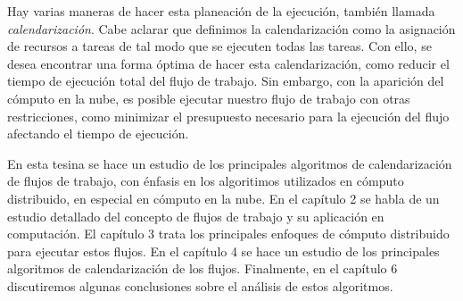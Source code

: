 Hay varias maneras de hacer esta planeación de la ejecución, también llamada \emph{calendarización}. Cabe aclarar que definimos la calendarización como la asignación de recursos a tareas de tal modo que se ejecuten todas las tareas. Con ello, se desea encontrar una forma óptima de hacer esta calendarización, como reducir el tiempo de ejecución total del flujo de trabajo. Sin embargo, con la aparición del cómputo en la nube, es posible ejecutar nuestro flujo de trabajo con otras restricciones, como minimizar el presupuesto necesario para la ejecución del flujo afectando el tiempo de ejecución.



En esta tesina se hace un estudio de los principales algoritmos de calendarización de flujos de trabajo, con énfasis en los algoritimos utilizados en cómputo distribuido, en especial en cómputo en la nube. En el capítulo 2 se habla de un estudio detallado del concepto de flujos de trabajo y su aplicación en computación. El capítulo 3 trata los principales enfoques de cómputo distribuido para ejecutar estos flujos. En el capítulo 4 se hace un estudio de los principales algoritmos de calendarización de los flujos. Finalmente, en el capítulo 6 discutiremos algunas conclusiones sobre el análisis de estos algoritmos.
